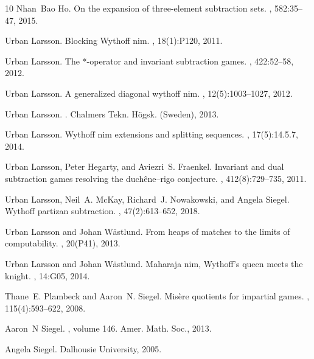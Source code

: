 \documentclass{amsart}
\theoremstyle{plain}
\theoremstyle{definition}
\begin{document}
\begin{thebibliography}{10}
Nhan~Bao Ho.
\newblock On the expansion of three-element subtraction sets.
, 582:35--47, 2015.

Urban Larsson.
\newblock Blocking {W}ythoff nim.
, 18(1):P120, 2011.

Urban Larsson.
\newblock The *-operator and invariant subtraction games.
, 422:52--58, 2012.

Urban Larsson.
\newblock A generalized diagonal wythoff nim.
, 12(5):1003--1027, 2012.

Urban Larsson.
.
\newblock Chalmers Tekn. H\"ogsk. (Sweden), 2013.

Urban Larsson.
\newblock Wythoff nim extensions and splitting sequences.
, 17(5):14.5.7, 2014.

Urban Larsson, Peter Hegarty, and Aviezri~S. Fraenkel.
\newblock Invariant and dual subtraction games resolving the duchêne–rigo
  conjecture.
, 412(8):729--735, 2011.

Urban Larsson, Neil~A. McKay, Richard~J. Nowakowski, and Angela Siegel.
\newblock Wythoff partizan subtraction.
, 47(2):613--652, 2018.

Urban Larsson and Johan W{\"a}stlund.
\newblock From heaps of matches to the limits of computability.
, 20(P41), 2013.

Urban Larsson and Johan W{\"a}stlund.
\newblock Maharaja nim, {W}ythoff's queen meets the knight.
, 14:G05, 2014.

Thane~E. Plambeck and Aaron~N. Siegel.
\newblock Misère quotients for impartial games.
, 115(4):593--622,
  2008.

Aaron~N Siegel.
, volume 146.
\newblock Amer. Math. Soc., 2013.

Angela Siegel.
\newblock Dalhousie University, 2005.


\end{thebibliography}
\end{document}
